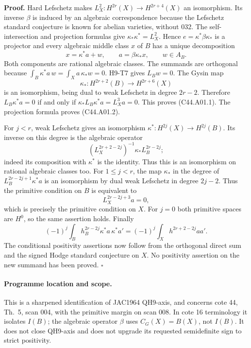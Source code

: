 \textbf{Proof.}
Hard Lefschetz makes $L_X^2:H^{2r}(X)\longrightarrow H^{2r+4}(X)$
an isomorphism. Its inverse $\beta$ is induced by an algebraic
correspondence because the Lefschetz standard conjecture is known
for abelian varieties, without 032. The self-intersection and
projection formulas give
$\kappa_*\kappa^*=L_X^2$. Hence
$e=\kappa^*\beta\kappa_*$ is a projector and every algebraic middle
class $x$ of $B$ has a unique decomposition
\[
 x=\kappa^*a+w,\qquad a=\beta\kappa_*x,\qquad w\in A_B.       \tag{C44.A01.3}
\]
Both components are rational algebraic classes. The summands are
orthogonal because
$\int_B\kappa^*a\,w=\int_Xa\,\kappa_*w=0$.
H9-T7 gives $L_Bw=0$. The Gysin map
\[
 \kappa_*:H^{2r+2}(B)\longrightarrow H^{2r+6}(X)
\]
is an isomorphism, being dual to weak Lefschetz in degree $2r-2$.
Therefore $L_B\kappa^*a=0$ if and only if
$\kappa_*L_B\kappa^*a=L_X^3a=0$. This proves (C44.A01.1).
The projection formula proves (C44.A01.2).

For $j<r$, weak Lefschetz gives an isomorphism
$\kappa^*:H^{2j}(X)\longrightarrow H^{2j}(B)$.
Its inverse on this degree is the algebraic operator
\[
 (L_X^{2r+2-2j})^{-1}\kappa_*L_B^{2r-2j};                   \tag{C44.A01.4}
\]
indeed its composition with $\kappa^*$ is the identity.
Thus this is an isomorphism on rational algebraic classes too.
For $1\le j<r$, the map $\kappa_*$ in the degree of
$L_B^{2r-2j+1}\kappa^*a$ is an isomorphism by dual weak
Lefschetz in degree $2j-2$. Thus the primitive condition on $B$
is equivalent to
\[
 L_X^{2r-2j+3}a=0,
\]
which is precisely the primitive condition on $X$. For $j=0$
both primitive spaces are $H^0$, so the same assertion holds.
Finally
\[
 (-1)^j\int_B h_B^{2r-2j}\kappa^*a\,\kappa^*a'
 =(-1)^j\int_Xh^{2r+2-2j}aa'.
\]
The conditional positivity assertions now follow from the
orthogonal direct sum and the signed Hodge standard conjecture on
$X$. No positivity assertion on the new summand has been proved.
\hfill$\square$

\paragraph{Programme location and scope.}
This is a sharpened identification of JAC1964 QH9-axis, and concerns
cote 44, Th.~5, scan 004, with the primitive margin on scan 008.
In cote 16 terminology it isolates $I(B)$; the algebraic operator
$\beta$ uses $C_G(X)=B(X)$, not $I(B)$. It does not close
QH9-axis and does not upgrade its requested semidefinite sign to
strict positivity.

